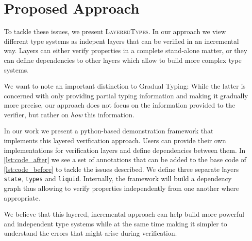 \documentclass{easychair}
\newcommand{\LayeredTypes}{\textsc{LayeredTypes}}
\begin{document}
\section{Proposed Approach}
\label{sec:proposed-approach}

To tackle these issues, we present \LayeredTypes. In our approach we view different type systems as indepent layers that can be verified in an incremental way. Layers can either verify properties in a complete stand-alone matter, or they can define dependencies to other layers which allow to build more complex type systems.

We want to note an important distinction to Gradual Typing\cite{gradual}: While the latter is concerned with only providing partial typing information and making it gradually more precise, our approach does not focus on the information provided to the verifier, but rather on \textit{how} this information.

In our work we present a python-based demonstration framework that implements this layered verification approach. Users can provide their own implementations for verification layers and define dependencies between them. In \autoref{lst:code_after} we see a set of annotations that can be added to the base code of \autoref{lst:code_before} to tackle the issues described. We define three separate layers \texttt{state}, \texttt{types} and \texttt{liquid}. Internally, the framework will build a dependency graph thus allowing to verify properties independently from one another where appropriate.

We believe that this layered, incremental approach can help build more powerful and independent type systems while at the same time making it simpler to understand the errors that might arise during verification.



\end{document}
